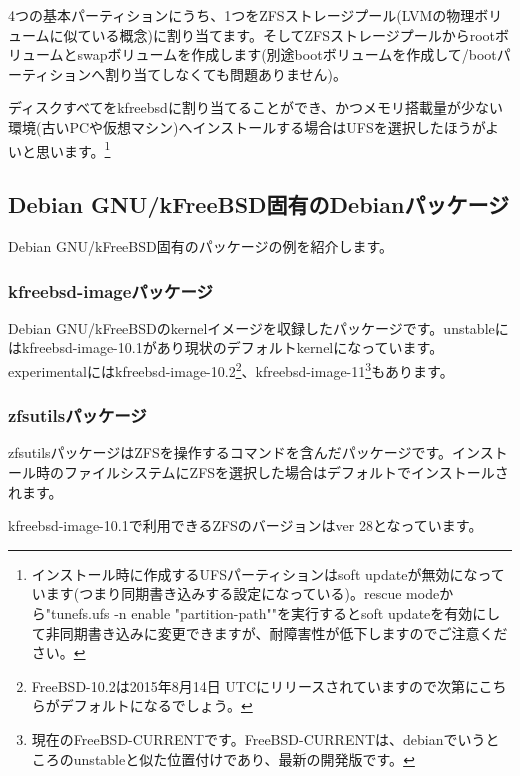 \documentclass[mingoth,a4paper]{jsarticle}
\begin{document}
4つの基本パーティションにうち、1つをZFSストレージプール(LVMの物理ボリュームに似ている概念)に割り当てます。そしてZFSストレージプールからrootボリュームとswapボリュームを作成します(別途bootボリュームを作成して/bootパーティションへ割り当てしなくても問題ありません)。

ディスクすべてをkfreebsdに割り当てることができ、かつメモリ搭載量が少ない環境(古いPCや仮想マシン)へインストールする場合はUFSを選択したほうがよいと思います。\footnote{インストール時に作成するUFSパーティションはsoft updateが無効になっています(つまり同期書き込みする設定になっている)。rescue modeから"tunefs.ufs -n enable "partition-path""を実行するとsoft updateを有効にして非同期書き込みに変更できますが、耐障害性が低下しますのでご注意ください。}

\subsection{Debian GNU/kFreeBSD固有のDebianパッケージ}

Debian GNU/kFreeBSD固有のパッケージの例を紹介します。

\subsubsection{kfreebsd-imageパッケージ}

Debian GNU/kFreeBSDのkernelイメージを収録したパッケージです。unstableにはkfreebsd-image-10.1があり現状のデフォルトkernelになっています。experimentalにはkfreebsd-image-10.2\footnote{FreeBSD-10.2は2015年8月14日 UTCにリリースされていますので次第にこちらがデフォルトになるでしょう。}、kfreebsd-image-11\footnote{現在のFreeBSD-CURRENTです。FreeBSD-CURRENTは、debianでいうところのunstableと似た位置付けであり、最新の開発版です。}もあります。

\subsubsection{zfsutilsパッケージ}

zfsutilsパッケージはZFSを操作するコマンドを含んだパッケージです。インストール時のファイルシステムにZFSを選択した場合はデフォルトでインストールされます。

kfreebsd-image-10.1で利用できるZFSのバージョンはver 28となっています。

\end{document}
